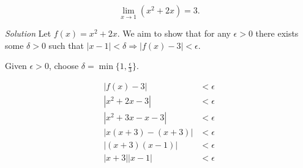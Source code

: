 \documentclass{article}
\begin{document}
\[
  \lim_{x \rightarrow 1} (x^2 + 2x) = 3.
\]

\textit{Solution} \: Let \(f(x) = x^2 + 2x\). We aim to show that for any
\(\epsilon > 0\) there exists some \(\delta > 0\) such that \(|x - 1| < \delta
\Rightarrow |f(x) - 3| < \epsilon\).

Given \(\epsilon > 0\), choose \(\delta = \min\{1, \frac{\epsilon}{3}\}\).

\[
  \begin{aligned}
    |f(x) - 3| & < \epsilon \\
    |x^2 + 2x - 3| & < \epsilon \\
    |x^2 + 3x - x - 3| & < \epsilon \\
    |x(x + 3) - (x + 3)| & < \epsilon \\
    |(x + 3)(x - 1)| & < \epsilon \\
    |x + 3||x - 1| & < \epsilon \\
  \end{aligned}
\]
\end{document}
